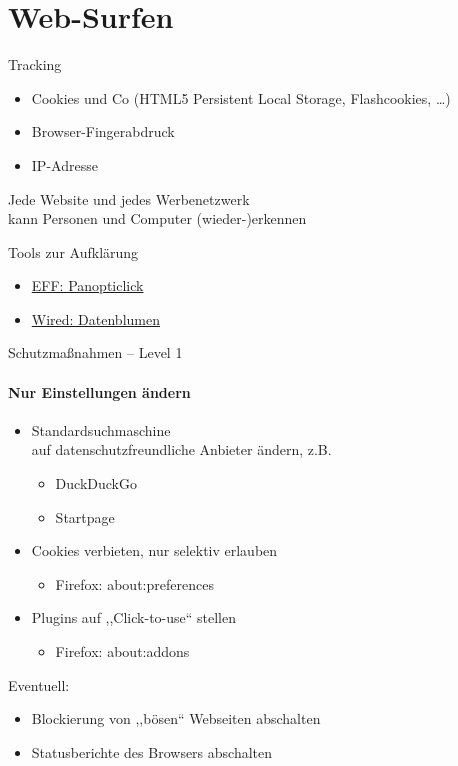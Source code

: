 \section{Web-Surfen}
\begin{frame}{Tracking}
  \begin{itemize}
    \item Cookies und Co (HTML5 Persistent Local Storage, Flashcookies, \ldots)
    \item Browser-Fingerabdruck
    \item IP-Adresse
  \end{itemize}
  Jede Website und jedes Werbenetzwerk\\kann Personen und Computer (wieder-)erkennen

  \begin{block}{Tools zur Aufklärung}
  \begin{itemize}
    \item \href{https://panopticlick.eff.org/}{EFF: Panopticlick}
    \item \href{http://datenblumen.wired.de/}{Wired: Datenblumen}
  \end{itemize}
  \end{block}
\end{frame}

\begin{frame}{Schutzmaßnahmen -- Level 1}
\framesubtitle{Nur Einstellungen ändern}
  \begin{itemize}
    \item Standardsuchmaschine\\ auf datenschutzfreundliche Anbieter ändern, z.B.
    \begin{itemize}
      \item DuckDuckGo
      \item Startpage
    \end{itemize}
    \item Cookies verbieten, nur selektiv erlauben
    \begin{itemize}
      \item Firefox: about:preferences
    \end{itemize}
    \item Plugins auf ,,Click-to-use`` stellen
    \begin{itemize}
      \item Firefox: about:addons
    \end{itemize}
  \end{itemize}

  Eventuell:
  \begin{itemize}
    \item Blockierung von ,,bösen`` Webseiten abschalten
    \item Statusberichte des Browsers abschalten
  \end{itemize}
\end{frame}

